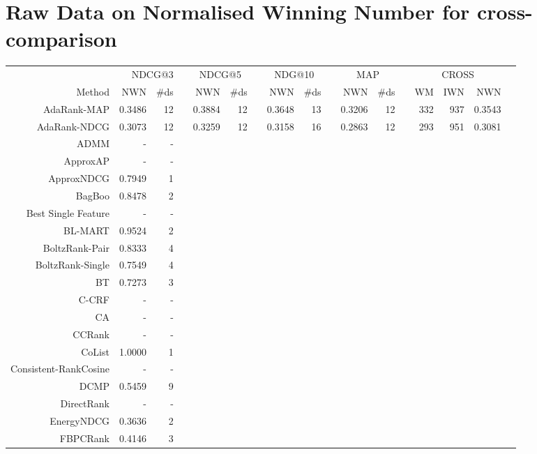 \documentclass{sig-alternate-2013}
\begin{document}
\section{Raw Data on Normalised Winning Number for cross-comparison}
\label{app:norm_winnum_all}
\onecolumn
\begin{longtable}{@{}rrrrrrrrrrrrrrrrr@{}}\toprule
& \multicolumn{2}{p{0.5cm}}{NDCG@3} & \phantom{a} 
& \multicolumn{2}{c}{NDCG@5} & \phantom{a} 
& \multicolumn{2}{c}{NDG@10} & \phantom{a} 
& \multicolumn{2}{c}{MAP}    & \phantom{a}
& \multicolumn{3}{c}{CROSS}\\
\cmidrule{2-3} \cmidrule{5-6} \cmidrule{8-9} \cmidrule{11-12} \cmidrule{14-16}
Method & NWN & \#ds && NWN & \#ds && NWN & \#ds && NWN & \#ds && WM & IWN & NWN \\ \midrule
AdaRank-MAP & 0.3486 & 12 && 0.3884 & 12 && 0.3648 & 13 && 0.3206 & 12 && 332 & 937 & 0.3543 \\
AdaRank-NDCG & 0.3073 & 12 && 0.3259 & 12 && 0.3158 & 16 && 0.2863 & 12 && 293 & 951 & 0.3081 \\
ADMM & - & - && & && & && & && & & \\
ApproxAP & - & - && & && & && & && & & \\
ApproxNDCG & 0.7949 & 1 && & && & && & && & & \\
BagBoo & 0.8478 & 2 && & && & && & && & & \\
Best Single Feature & - & - && & && & && & && & & \\
BL-MART & 0.9524 & 2 && & && & && & && & & \\
BoltzRank-Pair & 0.8333 & 4 && & && & && & && & & \\
BoltzRank-Single & 0.7549 & 4 && & && & && & && & & \\
BT & 0.7273 & 3 && & && & && & && & & \\
C-CRF & - & - && & && & && & && & & \\
CA & - & - && & && & && & && & & \\
CCRank & - & - && & && & && & && & & \\
CoList & 1.0000 & 1 && & && & && & && & & \\
Consistent-RankCosine & - & - && & && & && & && & & \\
DCMP & 0.5459 & 9 && & && & && & && & & \\
DirectRank & - & - && & && & && & && & & \\
EnergyNDCG & 0.3636 & 2 && & && & && & && & & \\
FBPCRank & 0.4146 & 3 && & && & && & && & & \\

\end{longtable}
\end{document}
